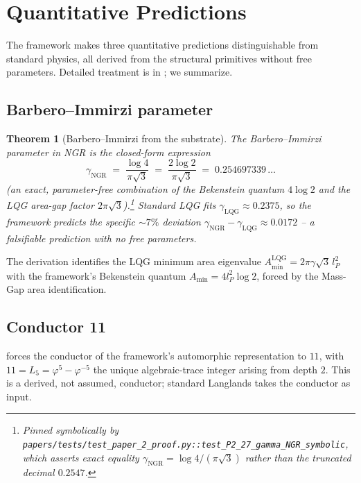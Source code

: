 \documentclass[11pt,a4paper]{article}
\theoremstyle{plain}
\newtheorem{theorem}{Theorem}[section]
\theoremstyle{definition}
\theoremstyle{remark}
\numberwithin{equation}{section}
\providecommand{\vp}{\varphi}
\providecommand{\Lk}{L}
\begin{document}
\section{Quantitative Predictions}
\label{sec:predictions}

The framework makes three quantitative predictions distinguishable
from standard physics, all derived from the structural primitives
without free parameters.  Detailed treatment is in
\cite{kg-paper,synthesis-paper}; we summarize.

\subsection{Barbero--Immirzi parameter}

\begin{theorem}[Barbero--Immirzi from the substrate]
\label{thm:barbero-immirzi}
The Barbero--Immirzi parameter in NGR is the closed-form expression
\begin{equation}\label{eq:gamma-ngr-symbolic}
  \gamma_{\text{NGR}} \;=\; \frac{\log 4}{\pi \sqrt{3}}
  \;=\; \frac{2\log 2}{\pi\sqrt{3}}
  \;=\; 0.254697339\,\ldots
\end{equation}
(an exact, parameter-free combination of the
Bekenstein quantum $4\log 2$ and the LQG area-gap factor
$2\pi\sqrt{3}$).\footnote{Pinned symbolically by
\texttt{papers/tests/test\_paper\_2\_proof.py::test\_P2\_27\_gamma\_NGR\_symbolic},
which asserts \emph{exact} equality
$\gamma_{\text{NGR}} = \log 4 / (\pi\sqrt{3})$ rather than the
truncated decimal $0.2547$.}  Standard LQG fits
$\gamma_{\text{LQG}} \approx 0.2375$, so the framework predicts the
specific $\sim 7\%$ deviation
$\gamma_{\text{NGR}} - \gamma_{\text{LQG}} \approx 0.0172$ -- a
falsifiable prediction with no free parameters.
\end{theorem}

The derivation \cite{kg-paper} identifies the LQG minimum area
eigenvalue $A_{\min}^{\text{LQG}} = 2\pi\gamma\sqrt{3}\, l_P^2$
with the framework's Bekenstein quantum
$A_{\min} = 4 l_P^2 \log 2$, forced by the Mass-Gap area
identification.

\subsection{Conductor 11}

 forces the conductor of the framework's
automorphic representation to $11$, with $11 = \Lk_5 = \vp^5 -
\vp^{-5}$ the unique algebraic-trace integer arising from depth $2$.
This is a derived, not assumed, conductor; standard Langlands
takes the conductor as input.
\end{document}
